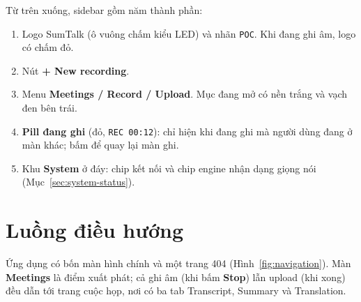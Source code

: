 \documentclass[12pt,a4paper]{report}
\newcommand{\ui}[1]{\textbf{#1}}
\begin{document}
Từ trên xuống, sidebar gồm năm thành phần:
\begin{enumerate}
  \item Logo SumTalk (ô vuông chấm kiểu LED) và nhãn \texttt{POC}. Khi đang ghi âm, logo có chấm đỏ.
  \item Nút \ui{+ New recording}.
  \item Menu \ui{Meetings / Record / Upload}. Mục đang mở có nền trắng và vạch đen bên trái.
  \item \textbf{Pill đang ghi} (đỏ, \texttt{REC 00:12}): chỉ hiện khi đang ghi mà người dùng đang ở màn khác; bấm
        để quay lại màn ghi.
  \item Khu \ui{System} ở đáy: chip kết nối và chip engine nhận dạng giọng nói (Mục~\ref{sec:system-status}).
\end{enumerate}

\section{Luồng điều hướng}

Ứng dụng có bốn màn hình chính và một trang 404 (Hình~\ref{fig:navigation}). Màn \ui{Meetings} là điểm xuất phát;
cả ghi âm (khi bấm \ui{Stop}) lẫn upload (khi xong) đều dẫn tới trang cuộc họp, nơi có ba tab Transcript, Summary
và Translation.
\end{document}
